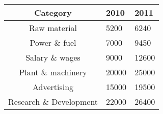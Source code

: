 \begin{tabular}{|c|p{1.5cm}|p{1.5cm}|}
    \hline
    Category &  2010 & 2011 \\
    \hline
    Raw material & 5200 & 6240 \\ 
    \hline
    Power \& fuel & 7000 & 9450 \\ 
    \hline
    Salary \& wages & 9000 & 12600 \\ 
    \hline
    Plant \& machinery & 20000 & 25000 \\ 
    \hline
    Advertising & 15000 & 19500 \\ 
    \hline
    Research \& Development & 22000 & 26400 \\ 
    \hline
\end{tabular}